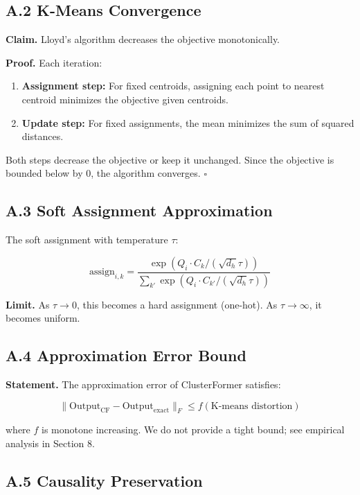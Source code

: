 \subsection{A.2 K-Means Convergence}

\textbf{Claim.} Lloyd's algorithm decreases the objective monotonically.

\textbf{Proof.} Each iteration:

\begin{enumerate}
\item \textbf{Assignment step:} For fixed centroids, assigning each point to
  nearest centroid minimizes the objective given centroids.
\item \textbf{Update step:} For fixed assignments, the mean minimizes the sum of
  squared distances.

\end{enumerate}
Both steps decrease the objective or keep it unchanged. Since the objective 
is bounded below by 0, the algorithm converges. $\square$

\subsection{A.3 Soft Assignment Approximation}

The soft assignment with temperature $\tau$:

\[
\text{assign}_{i,k} = \frac{\exp(Q_i \cdot C_k / (\sqrt{d_h} \tau))}{\sum_{k'} \exp(Q_i \cdot C_{k'} / (\sqrt{d_h} \tau))}
\]

\textbf{Limit.} As $\tau \to 0$, this becomes a hard assignment (one-hot). As 
$\tau \to \infty$, it becomes uniform.

\subsection{A.4 Approximation Error Bound}

\textbf{Statement.} The approximation error of ClusterFormer satisfies:

\[
\|\text{Output}_\text{CF} - \text{Output}_\text{exact}\|_F \leq f(\text{K-means distortion})
\]

where $f$ is monotone increasing. We do not provide a tight bound; see 
empirical analysis in Section 8.

\subsection{A.5 Causality Preservation}

